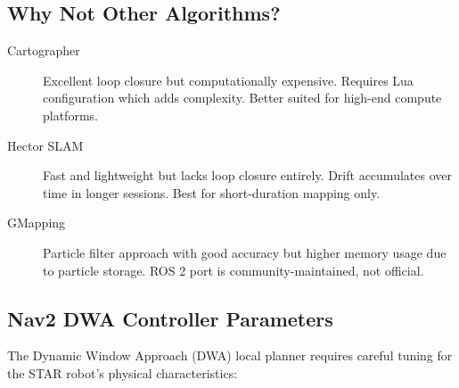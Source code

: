 \subsection{Why Not Other Algorithms?}

\begin{description}
    \item[Cartographer] Excellent loop closure but computationally expensive. Requires Lua configuration which adds complexity. Better suited for high-end compute platforms.

    \item[Hector SLAM] Fast and lightweight but lacks loop closure entirely. Drift accumulates over time in longer sessions. Best for short-duration mapping only.

    \item[GMapping] Particle filter approach with good accuracy but higher memory usage due to particle storage. ROS 2 port is community-maintained, not official.
\end{description}

\subsection{Nav2 DWA Controller Parameters}

The Dynamic Window Approach (DWA) local planner requires careful tuning for the STAR robot's physical characteristics:

